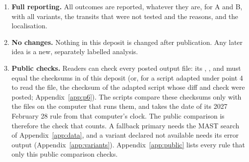 \begin{enumerate}
  the edited script keeps its registered file name (Appendix~\ref{app:p6}). It may not change any constant, window,
  mask, seed, threshold or rule. Before use, the edited script must reproduce exactly the  block of every
  photometric , and the  block and every  list of every
  localisation  (run times differ and are not compared). The diff and this check are posted, as
  in point 3, before the Sector 110 run. Variants are never edited. Any other failure of the localisation gives
  ``localisation not possible''.
\item \textbf{Full reporting.} All outcomes are reported, whatever they are, for A and B, with all variants, the
  transits that were not tested and the reasons, and the localisation.
\item \textbf{No changes.} Nothing in this deposit is changed after publication. Any later idea is a new, separately
  labelled analysis.
\item \textbf{Public checks.} Readers can check every posted output file: its ,
  ,  and  must equal the checksums in
   of this deposit (or, for a script adapted under point 4 to read the file, the checksum of the
  adapted script whose diff and check were posted; Appendix~\ref{app:p6}). The scripts compare these checksums only
  with the files on the computer that runs them, and  takes the date of its 2027 February 28
  rule from that computer's clock. The public comparison is therefore the check that counts. A fallback primary needs
  the MAST search of Appendix~\ref{app:data}, and a variant declared not available needs its error output
  (Appendix~\ref{app:variants}). Appendix~\ref{app:public} lists every rule that only this public comparison checks.
\end{enumerate}
